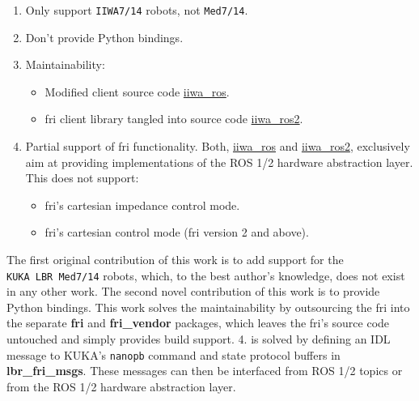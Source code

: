\begin{enumerate}
\def\labelenumi{\arabic{enumi}.}
\item
  Only support \texttt{IIWA7/14} robots, not \texttt{Med7/14}.
\item
  Don't provide Python bindings.
\item
  Maintainability:

  \begin{itemize}
  \item
    Modified client source code
    \href{https://github.com/epfl-lasa/iiwa_ros}{iiwa\_ros}.
  \item
    \acrshort{fri} client library tangled into source code
    \href{https://github.com/ICube-Robotics/iiwa_ros2}{iiwa\_ros2}.
  \end{itemize}
\item
  Partial support of \acrshort{fri} functionality. Both,
  \href{https://github.com/epfl-lasa/iiwa_ros}{iiwa\_ros} and
  \href{https://github.com/ICube-Robotics/iiwa_ros2}{iiwa\_ros2},
  exclusively aim at providing implementations of the ROS 1/2 hardware
  abstraction layer. This does not support:

  \begin{itemize}
  \item
    \acrshort{fri}'s cartesian impedance control mode.
  \item
    \acrshort{fri}'s cartesian control mode (\acrshort{fri} version 2 and above).
  \end{itemize}
\end{enumerate}

The first original contribution of this work is to add support for the
\texttt{KUKA\ LBR\ Med7/14} robots, which, to the best author's
knowledge, does not exist in any other work. The second novel
contribution of this work is to provide Python bindings. This work
solves the maintainability by outsourcing the \acrshort{fri} into the separate
\textbf{fri} and \textbf{fri\_vendor} packages, which leaves the \acrshort{fri}'s
source code untouched and simply provides build support. 4. is solved by
defining an IDL message to KUKA's \texttt{nanopb} command and state
protocol buffers in \textbf{lbr\_fri\_msgs}. These messages can then be
interfaced from ROS 1/2 topics or from the ROS 1/2 hardware abstraction
layer.

